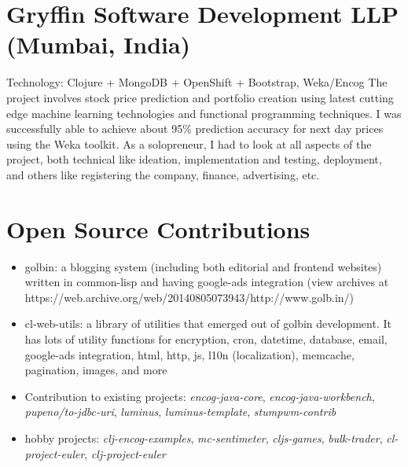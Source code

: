 \documentclass[11pt,a4paper,sans]{moderncv} %
\begin{document}
\section{Gryffin Software Development LLP (Mumbai, India)}
         {}{Technology: Clojure + MongoDB + OpenShift + Bootstrap, Weka/Encog}
         {The project involves stock price prediction and portfolio creation using latest cutting edge machine learning technologies and functional programming techniques. I was successfully able to achieve about 95\% prediction accuracy for next day prices using the Weka toolkit. As a solopreneur, I had to look at all aspects of the project, both technical like ideation, implementation and testing, deployment, and others like registering the company, finance, advertising, etc.}

\newpage{}
\section{Open Source Contributions}
         {\begin{itemize}
           \item golbin: a blogging system (including both editorial and frontend websites) written in common-lisp and having google-ads integration (view archives at https://web.archive.org/web/20140805073943/http://www.golb.in/)
           \item cl-web-utils: a library of utilities that emerged out of golbin development. It has lots of utility functions for encryption, cron, datetime, database, email, google-ads integration, html, http, js, l10n (localization), memcache, pagination, images, and more
           \item Contribution to existing projects: \textit{encog-java-core}, \textit{encog-java-workbench}, \textit{pupeno/to-jdbc-uri}, \textit{luminus}, \textit{luminus-template}, \textit{stumpwm-contrib}
           \item hobby projects: \textit{clj-encog-examples}, \textit{mc-sentimeter}, \textit{cljs-games}, \textit{bulk-trader}, \textit{cl-project-euler}, \textit{clj-project-euler}
         \end{itemize}}
\end{document}
